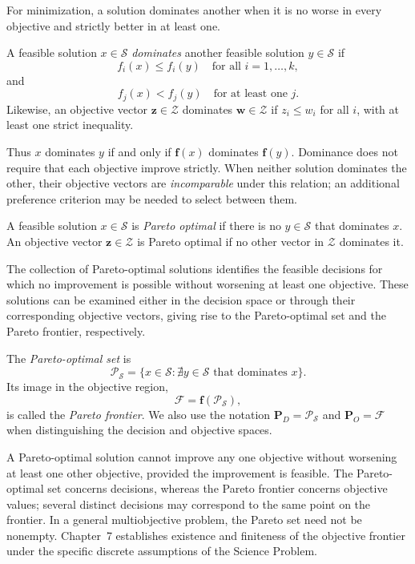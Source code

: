For minimization, a solution dominates another when it is no worse in every objective and strictly better in at least one.

\begin{definition}
\label{def:multiobjective_dominance}
A feasible solution $x\in\mathcal{S}$ \emph{dominates} another feasible solution $y\in\mathcal{S}$ if
\[
f_i(x)\leq f_i(y)\quad\text{for all }i=1,\ldots,k,
\]
and
\[
f_j(x)<f_j(y)\quad\text{for at least one }j.
\]
Likewise, an objective vector $\mathbf{z}\in\mathcal{Z}$ dominates $\mathbf{w}\in\mathcal{Z}$ if $z_i\leq w_i$ for all $i$, with at least one strict inequality.
\end{definition}

Thus $x$ dominates $y$ if and only if $\mathbf{f}(x)$ dominates $\mathbf{f}(y)$. Dominance does not require that each objective improve strictly. When neither solution dominates the other, their objective vectors are \emph{incomparable} under this relation; an additional preference criterion may be needed to select between them.

\begin{definition}
\label{def:pareto_optimal}
A feasible solution $x\in\mathcal{S}$ is \emph{Pareto optimal} if there is no $y\in\mathcal{S}$ that dominates $x$. An objective vector $\mathbf{z}\in\mathcal{Z}$ is Pareto optimal if no other vector in $\mathcal{Z}$ dominates it.
\end{definition}

The collection of Pareto-optimal solutions identifies the feasible decisions for which no improvement is possible without worsening at least one objective. These solutions can be examined either in the decision space or through their corresponding objective vectors, giving rise to the Pareto-optimal set and the Pareto frontier, respectively.

\begin{definition}
\label{def:pareto_set_frontier}
The \emph{Pareto-optimal set} is
\[
\mathcal{P}_{\mathcal{S}}
=\{x\in\mathcal{S}:\nexists y\in\mathcal{S}\text{ that dominates }x\}.
\]
Its image in the objective region,
\[
\mathcal{F}=\mathbf{f}(\mathcal{P}_{\mathcal{S}}),
\]
is called the \emph{Pareto frontier}. We also use the notation $\mathbf{P}_D=\mathcal{P}_{\mathcal{S}}$ and $\mathbf{P}_O=\mathcal{F}$ when distinguishing the decision and objective spaces.
\end{definition}

A Pareto-optimal solution cannot improve any one objective without worsening at least one other objective, provided the improvement is feasible. The Pareto-optimal set concerns decisions, whereas the Pareto frontier concerns objective values; several distinct decisions may correspond to the same point on the frontier. In a general multiobjective problem, the Pareto set need not be nonempty. Chapter~7 establishes existence and finiteness of the objective frontier under the specific discrete assumptions of the Science Problem.

